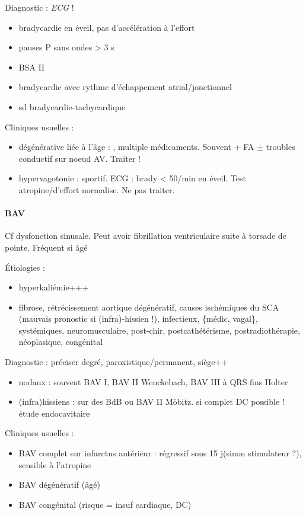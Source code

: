 Diagnostic : \textit{ECG} ! 
\begin{itemize}
  \item bradycardie en éveil, pas d'accélération à l'effort
  \item pauses P sans ondes > 3 s
  \item BSA II
  \item bradycardie avec rythme d'échappement atrial/jonctionnel
  \item sd bradycardie-tachycardique
\end{itemize}

Cliniques usuelles :
\begin{itemize}
  \item dégénérative liée à l'âge : \female, multiple médicaments. Souvent + FA
    $\pm$ troubles conductif sur noeud AV. Traiter !
  \item hypervagotonie : sportif. ECG : brady < 50/min en éveil. Test
    atropine/d'effort normalise. Ne pas traiter.
\end{itemize}

\paragraph{BAV}
Cf dysfonction sinusale. Peut avoir fibrillation ventriculaire suite à torsade
de pointe. Fréquent si âgé

Étiologies :
\begin{itemize}
\item hyperkaliémie+++ 
\item fibrose, rétrécissement aortique dégénératif, causes ischémiques
du SCA (mauvais pronostic si (infra)-hissien !), infectieux, \{médic, vagal\},
systémiques, neuromusculaire, post-chir, postcathétérisme, postradiothérapie,
néoplasique, congénital
\end{itemize}

Diagnostic : préciser degré, paroxistique/permanent, siège++ 
\begin{itemize}
  \item nodaux : souvent BAV I, BAV II Wenckebach, BAV III à QRS fins \thus
   Holter
  \item (infra)hissiens : sur des BdB ou BAV II Möbitz. \skull{} si complet DC
    possible !\\
    \thus étude endocavitaire
\end{itemize}

Cliniques usuelles :
\begin{itemize}
  \item BAV complet sur infarctus antérieur : régressif sous 15 j(sinon stimulateur ?),
    sensible à l'atropine
  \item BAV dégénératif (âgé)
  \item BAV congénital (risque = insuf cardiaque, DC)
\end{itemize}


